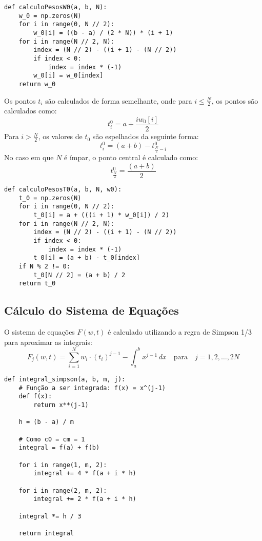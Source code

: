 \documentclass[12pt,letterpaper]{article}
\begin{document}
\begin{lstlisting}[style=Python]
def calculoPesosW0(a, b, N):
    w_0 = np.zeros(N)
    for i in range(0, N // 2):
        w_0[i] = ((b - a) / (2 * N)) * (i + 1)
    for i in range(N // 2, N):
        index = (N // 2) - ((i + 1) - (N // 2))
        if index < 0:
            index = index * (-1)
        w_0[i] = w_0[index]
    return w_0
\end{lstlisting}

Os pontos \(t_i\) são calculados de forma semelhante, onde para \(i \leq \frac{N}{2}\), os pontos são calculados como:
\[
t_i^0 = a + \frac{i w_0[i]}{2}
\]
Para \(i > \frac{N}{2}\), os valores de \(t_0\) são espelhados da seguinte forma:
\[
t_i^0 = (a + b) - t^0_{\frac{N}{2}-i}
\]
No caso em que \(N\) é ímpar, o ponto central é calculado como:
\[
t^0_{\frac{N}{2}} = \frac{(a + b)}{2}
\]

\begin{lstlisting}[style=Python]
def calculoPesosT0(a, b, N, w0):
    t_0 = np.zeros(N)
    for i in range(0, N // 2):
        t_0[i] = a + (((i + 1) * w_0[i]) / 2)
    for i in range(N // 2, N):
        index = (N // 2) - ((i + 1) - (N // 2))
        if index < 0:
            index = index * (-1)
        t_0[i] = (a + b) - t_0[index]
    if N % 2 != 0:
        t_0[N // 2] = (a + b) / 2
    return t_0
\end{lstlisting}

\subsection{Cálculo do Sistema de Equações}
O sistema de equações \(F(w, t)\) é calculado utilizando a regra de Simpson 1/3 para aproximar as integrais:
\[
F_j(w, t) = \sum_{i=1}^{N} w_i \cdot (t_i)^{j-1} - \int_{a}^{b} x^{j-1} \, dx \quad \text{para} \quad j = 1, 2, \dots, 2N
\]

\begin{lstlisting}[style=Python]
def integral_simpson(a, b, m, j):
    # Função a ser integrada: f(x) = x^(j-1)
    def f(x):
        return x**(j-1)
    
    h = (b - a) / m
    
    # Como c0 = cm = 1 
    integral = f(a) + f(b)
    
    for i in range(1, m, 2):  
        integral += 4 * f(a + i * h)
    
    for i in range(2, m, 2):  
        integral += 2 * f(a + i * h)
    
    integral *= h / 3
    
    return integral
\end{lstlisting}
\end{document}
